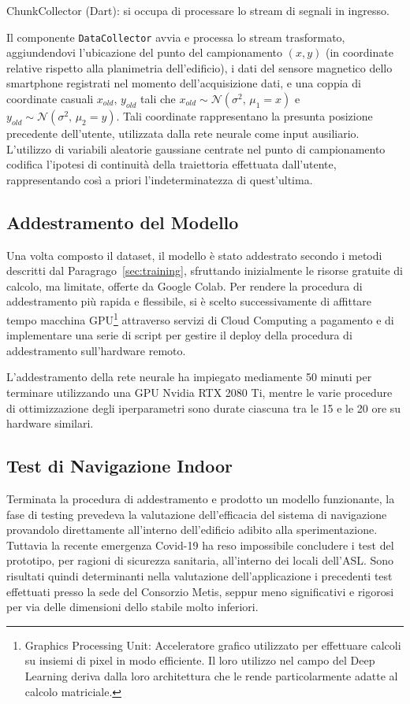 \begin{listing}[H]
	\caption{ChunkCollector (Dart): si occupa di processare lo stream di segnali in
    ingresso.}
  \label{code:chunk-collector}
\end{listing}

Il componente \texttt{DataCollector} avvia e processa lo stream trasformato,
aggiundendovi l'ubicazione del punto del campionamento \((x, y)\) (in coordinate
relative rispetto alla planimetria dell'edificio), i dati del sensore magnetico
dello smartphone registrati nel momento dell'acquisizione dati, e una coppia di
coordinate casuali \(x_{old}, \, y_{old}\) tali che 
\( x_{old} \sim \mathcal{N}(\sigma^2, \, \mu_1 = x) \) e 
\( y_{old} \sim \mathcal{N}(\sigma^2, \, \mu_2 = y) \). Tali coordinate
rappresentano la presunta posizione precedente dell'utente, utilizzata dalla
rete neurale come input ausiliario. L'utilizzo di variabili aleatorie gaussiane
centrate nel punto di campionamento codifica l'ipotesi di continuità della
traiettoria effettuata dall'utente, rappresentando così a priori
l'indeterminatezza di quest'ultima.
\subsection{Addestramento del Modello}
Una volta composto il dataset, il modello è stato addestrato secondo i metodi
descritti dal Paragrago~\ref{sec:training}, sfruttando inizialmente le risorse
gratuite di calcolo, ma limitate, offerte da Google Colab. Per rendere la
procedura di addestramento più rapida e flessibile, si è scelto successivamente
di affittare tempo macchina GPU\footnote{Graphics Processing Unit: Acceleratore
  grafico utilizzato per effettuare calcoli su insiemi di pixel in modo
  efficiente. Il loro utilizzo nel campo del Deep Learning deriva dalla loro
  architettura che le rende particolarmente adatte al calcolo matriciale.}
attraverso servizi di Cloud Computing a pagamento e di implementare una serie
di script per gestire il deploy della procedura di addestramento sull'hardware
remoto.

L'addestramento della rete neurale ha impiegato mediamente 50 minuti per
terminare utilizzando una GPU Nvidia RTX 2080 Ti, mentre le varie procedure di
ottimizzazione degli iperparametri sono durate ciascuna tra le 15 e le 20 ore
su hardware similari.
\subsection{Test di Navigazione Indoor}
Terminata la procedura di addestramento e prodotto un modello funzionante, la
fase di testing prevedeva la valutazione dell'efficacia del sistema di
navigazione provandolo direttamente all'interno dell'edificio adibito alla
sperimentazione. Tuttavia la recente emergenza Covid-19 ha reso impossibile
concludere i test del prototipo, per ragioni di sicurezza sanitaria,
all'interno dei locali dell'ASL\@. Sono risultati quindi determinanti nella
valutazione dell'applicazione i precedenti test effettuati presso la sede del
Consorzio Metis, seppur meno significativi e rigorosi per via delle dimensioni 
dello stabile molto inferiori.

